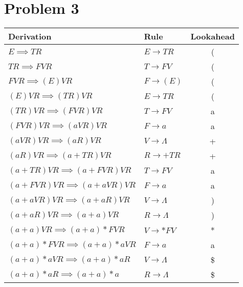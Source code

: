 \documentclass[12pt]{article}
\begin{document}
\pagebreak
\section*{Problem 3}

\begin{tabular}{llc}
\textbf{Derivation} & \textbf{Rule} & \textbf{Lookahead} \\
\hline
\(E \implies TR\) & \(E \rightarrow TR\) & ( \\
\(TR \implies FVR\) & \(T \rightarrow FV\) & ( \\
\(FVR \implies (E)VR\) & \(F \rightarrow (E)\) & ( \\
\((E)VR \implies (TR)VR\) & \(E \rightarrow TR\) & ( \\
\((TR)VR \implies (FVR)VR\) & \(T \rightarrow FV\) & a \\
\((FVR)VR \implies (aVR)VR\) & \(F \rightarrow a\) & a \\
\((aVR)VR \implies (aR)VR\) & \(V \rightarrow \Lambda\) & + \\
\((aR)VR \implies (a+TR)VR\) & \(R \rightarrow +TR\) & + \\
\((a+TR)VR \implies (a+FVR)VR\) & \(T \rightarrow FV\) & a \\
\((a+FVR)VR \implies (a+aVR)VR\) & \(F \rightarrow a\) & a \\
\((a+aVR)VR \implies (a+aR)VR\) & \(V \rightarrow \Lambda\) & ) \\
\((a+aR)VR \implies (a+a)VR\) & \(R \rightarrow \Lambda\) & ) \\
\((a+a)VR \implies (a+a)*FVR\) & \(V \rightarrow *FV\) & * \\
\((a+a)*FVR \implies (a+a)*aVR\) & \(F \rightarrow a\) & a \\
\((a+a)*aVR \implies (a+a)*aR\) & \(V \rightarrow \Lambda\) & \$ \\
\((a+a)*aR \implies (a+a)*a\) & \(R \rightarrow \Lambda\) & \$ \\
\end{tabular}
\end{document}
